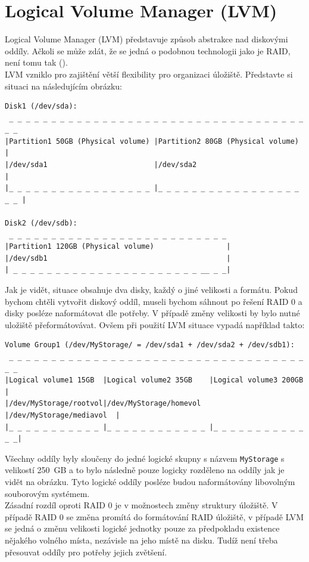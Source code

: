 \section{Logical Volume Manager (LVM)}
Logical Volume Manager (LVM) představuje způsob abstrakce nad diskovými oddíly. Ačkoli se může zdát, že se jedná o podobnou technologii jako je RAID, není tomu tak (\cite{arch-lvm}).\\
LVM vzniklo pro zajištění větší flexibility pro organizaci úložiště. Představte si situaci na následujícím obrázku:
\begin{verbatim}
Disk1 (/dev/sda):
 _ _ _ _ _ _ _ _ _ _ _ _ _ _ _ _ _ _ _ _ _ _ _ _ _ _ _ _ _ _ _ _ _ _ _ _ _
|Partition1 50GB (Physical volume) |Partition2 80GB (Physical volume)     |
|/dev/sda1                         |/dev/sda2                             |
|_ _ _ _ _ _ _ _ _ _ _ _ _ _ _ _ _ |_ _ _ _ _ _ _ _ _ _ _ _ _ _ _ _ _ _ _ |
                                                     
Disk2 (/dev/sdb):
 _ _ _ _ _ _ _ _ _ _ _ _ _ _ _ _ _ _ _ _ _ _ _ _ _ _
|Partition1 120GB (Physical volume)                 |
|/dev/sdb1                                          |
| _ _ _ _ _ _ _ _ _ _ _ _ _ _ _ _ _ _ _ _ _ _ __ _ _|
\end{verbatim}
Jak je vidět, situace obsahuje dva disky, každý o jiné velikosti a formátu. Pokud bychom chtěli vytvořit diskový oddíl, museli bychom sáhnout po řešení RAID 0 a disky posléze naformátovat dle potřeby. V případě změny velikosti by bylo nutné uložiště přeformátovávat. Ovšem při použití LVM situace vypadá například takto:
\begin{verbatim}
Volume Group1 (/dev/MyStorage/ = /dev/sda1 + /dev/sda2 + /dev/sdb1):
 _ _ _ _ _ _ _ _ _ _ _ _ _ _ _ _ _ _ _ _ _ _ _ _ _ _ _ _ _ _ _ _ _ _ _ _ _ 
|Logical volume1 15GB  |Logical volume2 35GB    |Logical volume3 200GB    |
|/dev/MyStorage/rootvol|/dev/MyStorage/homevol  |/dev/MyStorage/mediavol  |
|_ _ _ _ _ _ _ _ _ _ _ |_ _ _ _ _ _ _ _ _ _ _ _ |_ _ _ _ _ _ _ _ _ _ _ _ _|
\end{verbatim}
Všechny oddíly byly sloučeny do jedné logické skupny s názvem \texttt{MyStorage} s velikostí 250~GB a to bylo následně pouze logicky rozděleno na oddíly jak je vidět na obrázku. Tyto logické oddíly posléze budou naformátovány libovolným souborovým systémem.\\
Zásadní rozdíl oproti RAID 0 je v možnostech změny struktury úložiště. V případě RAID 0 se změna promítá do formátování RAID úložiště, v případě LVM se jedná o změnu velikosti logické jednotky pouze za předpokladu existence nějakého volného místa, nezávisle na jeho místě na disku. Tudíž není třeba přesouvat oddíly pro potřeby jejich zvětšení.


